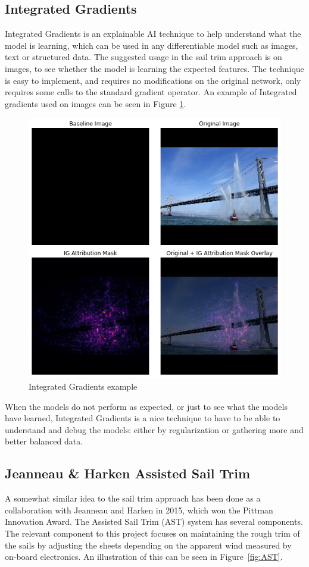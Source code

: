 \subsection{Integrated Gradients} \label{LR:IG}
Integrated Gradients is an explainable AI technique to help understand what the model is learning, which can be used in any differentiable model such as images, text or structured data. \cite{TF:IG} The suggested usage in the sail trim approach is on images, to see whether the model is learning the expected features. The technique is easy to implement, and requires no modifications on the original network, only requires some calls to the standard gradient operator. \cite{IGpaper} An example of Integrated gradients used on images can be seen in Figure \ref{fig:IG}. 

\begin{figure}[h]
\centering
\includegraphics[width = 0.7\hsize]{figures/IG_fireboat.png}
\caption{Integrated Gradients example \cite{TF:IG}}
\label{fig:IG}
\end{figure}

When the models do not perform as expected, or just to see what the models have learned, Integrated Gradients is a nice technique to have to be able to understand and debug the models: either by regularization or gathering more and better balanced data.

\subsection{Jeanneau \& Harken Assisted Sail Trim} \label{LR:AST}
A somewhat similar idea to the sail trim approach has been done as a collaboration with Jeanneau and Harken in 2015, \cite{harkenAST} which won the Pittman Innovation Award. \cite{pittman_awards}
The Assisted Sail Trim (AST) system has several components. The relevant component to this project focuses on maintaining the rough trim of the sails by adjusting the sheets depending on the apparent wind measured by on-board electronics. An illustration of this can be seen in Figure~\ref{fig:AST}.

